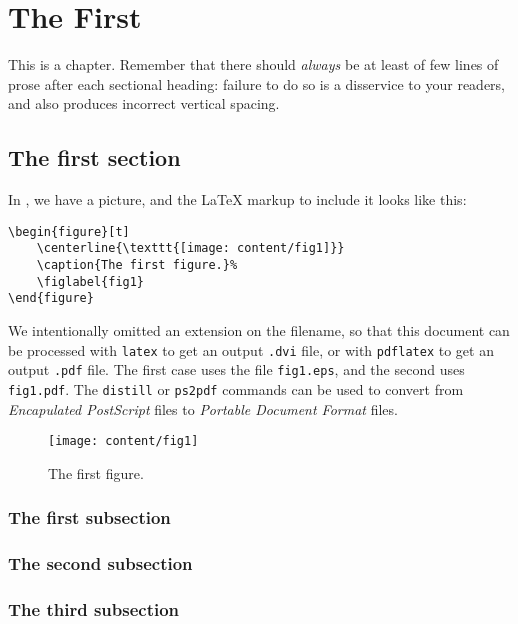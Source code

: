 
\chapter{The First}

This is a chapter.  Remember  that there should \emph{always}
be at least of few lines of prose after each sectional heading:
failure to do so is a disservice to your readers, and also
produces incorrect vertical spacing.

\section{The first section}

\blah

In , we have a picture, and the \LaTeX{} markup
to include it looks like this:
%
\begin{verbatim}
\begin{figure}[t]
    \centerline{\texttt{[image: content/fig1]}}
    \caption{The first figure.}%
    \figlabel{fig1}
\end{figure}
\end{verbatim}
%
We intentionally omitted an extension on the filename, so that this
document can be processed with \verb=latex= to get an output
\verb=.dvi= file, or with \verb=pdflatex= to get an output \verb=.pdf=
file.  The first case uses the file \verb=fig1.eps=, and the second
uses \verb=fig1.pdf=.  The \verb=distill= or \verb=ps2pdf= commands
can be used to convert from \emph{Encapulated PostScript}%
files to \emph{Portable Document Format}%
files.

\begin{figure}[t]
    \centerline{\texttt{[image: content/fig1]}}
    \caption{The first figure.}%
\end{figure}

\blah

\subsection{The first subsection}

\blah

\subsection{The second subsection}

\blah

\subsection{The third subsection}

